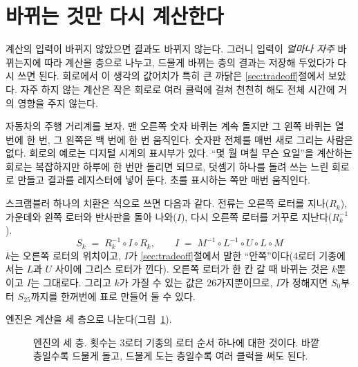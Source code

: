 \section{바뀌는 것만 다시 계산한다}\label{sec:e-recompute}

\Why 계산의 입력이 바뀌지 않았으면 결과도 바뀌지 않는다. 그러니 입력이 \emph{얼마나 자주} 바뀌는지에 따라
계산을 층으로 나누고, 드물게 바뀌는 층의 결과는 저장해 두었다가 다시 쓰면 된다. 회로에서 이 생각의 값어치가
특히 큰 까닭은 \ref{sec:tradeoff}절에서 보았다. 자주 하지 않는 계산은 작은 회로로 여러 클럭에 걸쳐 천천히
해도 전체 시간에 거의 영향을 주지 않는다.

\General 자동차의 주행 거리계를 보자. 맨 오른쪽 숫자 바퀴는 계속 돌지만 그 왼쪽 바퀴는 열 번에 한 번,
그 왼쪽은 백 번에 한 번 움직인다. 숫자판 전체를 매번 새로 그리는 사람은 없다. 회로의 예로는 디지털 시계의
표시부가 있다. ``몇 월 며칠 무슨 요일''을 계산하는 회로는 복잡하지만 하루에 한 번만 돌리면 되므로, 덧셈기
하나를 돌려 쓰는 느린 회로로 만들고 결과를 레지스터에 넣어 둔다. 초를 표시하는 쪽만 매번 움직인다.

\Ours 스크램블러 하나의 치환은 식으로 쓰면 다음과 같다. 전류는 오른쪽 로터를 지나($R_k$), 가운데와 왼쪽
로터와 반사판을 돌아 나와($I$), 다시 오른쪽 로터를 거꾸로 지난다($R_k^{-1}$).
\[
  S_k \;=\; R_k^{-1} \circ I \circ R_k, \qquad
  I \;=\; M^{-1} \circ L^{-1} \circ U \circ L \circ M
\]
$k$는 오른쪽 로터의 위치이고, $I$가 \ref{sec:tradeoff}절에서 말한 ``안쪽''이다(4로터 기종에서는 $L$과 $U$
사이에 그리스 로터가 낀다). 오른쪽 로터가 한 칸 갈 때 바뀌는 것은 $k$뿐이고 $I$는 그대로다. 그리고 $k$가
가질 수 있는 값은 26가지뿐이므로, $I$가 정해지면 $S_0$부터 $S_{25}$까지를 한꺼번에 표로 만들어 둘 수 있다.

엔진은 계산을 세 층으로 나눈다(그림~\ref{fig:g-e-layers}).

\begin{figure}[ht]
\centering
{}
\caption{엔진의 세 층. 횟수는 3로터 기종의 로터 순서 하나에 대한 것이다. 바깥 층일수록 드물게 돌고, 드물게
도는 층일수록 여러 클럭을 써도 된다.}
\label{fig:g-e-layers}
\end{figure}

